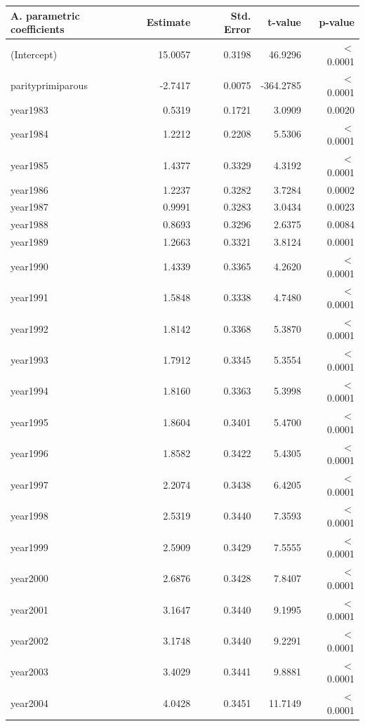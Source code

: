     \begin{table}[H]
    \centering
    \begin{tabular}{lrrrr}
    \textbf{A. parametric coefficients} & Estimate & Std. Error & t-value & p-value \\ 
       \hline
       \hline
      (Intercept) & 15.0057 & 0.3198 & 46.9296 & $<$ 0.0001 \\ 
      parityprimiparous & -2.7417 & 0.0075 & -364.2785 & $<$ 0.0001 \\ 
      year1983 & 0.5319 & 0.1721 & 3.0909 & 0.0020 \\ 
      year1984 & 1.2212 & 0.2208 & 5.5306 & $<$ 0.0001 \\ 
      year1985 & 1.4377 & 0.3329 & 4.3192 & $<$ 0.0001 \\ 
      year1986 & 1.2237 & 0.3282 & 3.7284 & 0.0002 \\ 
      year1987 & 0.9991 & 0.3283 & 3.0434 & 0.0023 \\ 
      year1988 & 0.8693 & 0.3296 & 2.6375 & 0.0084 \\ 
      year1989 & 1.2663 & 0.3321 & 3.8124 & 0.0001 \\ 
      year1990 & 1.4339 & 0.3365 & 4.2620 & $<$ 0.0001 \\ 
      year1991 & 1.5848 & 0.3338 & 4.7480 & $<$ 0.0001 \\ 
      year1992 & 1.8142 & 0.3368 & 5.3870 & $<$ 0.0001 \\ 
      year1993 & 1.7912 & 0.3345 & 5.3554 & $<$ 0.0001 \\ 
      year1994 & 1.8160 & 0.3363 & 5.3998 & $<$ 0.0001 \\ 
      year1995 & 1.8604 & 0.3401 & 5.4700 & $<$ 0.0001 \\ 
      year1996 & 1.8582 & 0.3422 & 5.4305 & $<$ 0.0001 \\ 
      year1997 & 2.2074 & 0.3438 & 6.4205 & $<$ 0.0001 \\ 
      year1998 & 2.5319 & 0.3440 & 7.3593 & $<$ 0.0001 \\ 
      year1999 & 2.5909 & 0.3429 & 7.5555 & $<$ 0.0001 \\ 
      year2000 & 2.6876 & 0.3428 & 7.8407 & $<$ 0.0001 \\ 
      year2001 & 3.1647 & 0.3440 & 9.1995 & $<$ 0.0001 \\ 
      year2002 & 3.1748 & 0.3440 & 9.2291 & $<$ 0.0001 \\ 
      year2003 & 3.4029 & 0.3441 & 9.8881 & $<$ 0.0001 \\ 
      year2004 & 4.0428 & 0.3451 & 11.7149 & $<$ 0.0001 \\ 

\end{tabular}
\end{table}
